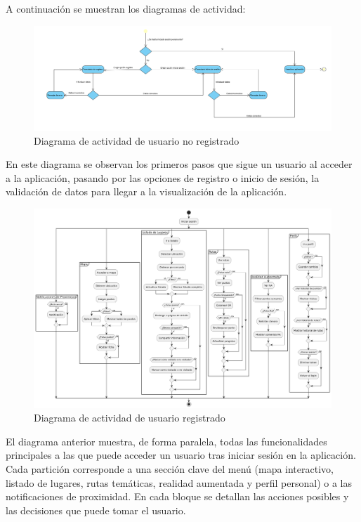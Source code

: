 A continuación se muestran los diagramas de actividad:

\begin{figure}[H]
    \centering
    \includegraphics[width=1\textwidth]{figs/diagrama_actividad_usuario_no_registrado.png}
    \caption{Diagrama de actividad de usuario no registrado}
\end{figure}

En este diagrama se observan los primeros pasos que sigue un usuario al acceder a la aplicación, pasando por las opciones de registro o inicio de sesión, la validación de datos para llegar a la visualización de la aplicación.

\begin{figure}[H]
    \centering
    \includegraphics[width=1\textwidth]{figs/diagrama_actividad_usuario_registrado.png}
    \caption{Diagrama de actividad de usuario registrado}
\end{figure}

El diagrama anterior muestra, de forma paralela, todas las funcionalidades principales a las que puede acceder un usuario tras iniciar sesión en la aplicación. Cada partición corresponde a una sección clave del menú (mapa interactivo, listado de lugares, rutas temáticas, realidad aumentada y perfil personal) o a las notificaciones de proximidad. En cada bloque se detallan las acciones posibles y las decisiones que puede tomar el usuario.

